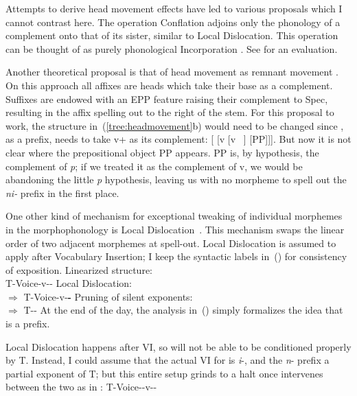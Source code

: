 Attempts to derive head movement effects have led to various proposals which I cannot contrast here. The operation Conflation \citep{halekeyser02,harley13oup} adjoins only the phonology of a complement onto that of its sister, similar to Local Dislocation. This operation can be thought of as purely phonological Incorporation \citep{baker85,baker88}. See \citet[Ch.~2.5]{rimell12} for an evaluation.

Another theoretical proposal is that of head movement as remnant movement \citep{koopmanszabolcsi00,koopman05,koopman15u20}. On this approach all affixes are heads which take their base as a complement. Suffixes are endowed with an EPP feature raising their complement to Spec, resulting in the affix spelling out to the right of the stem. For this proposal to work, the structure in~(\ref{tree:headmovement}b) would need to be changed since \pz, as a prefix, needs to take v+ as its complement: [{\pz} [v [v ~\!] [PP]]]. But now it is not clear where the prepositional object PP appears. PP is, by hypothesis, the complement of \emph{p}; if we treated it as the complement of v, we would be abandoning the little \emph{p} hypothesis, leaving us with no morpheme to spell out the \emph{ni-} prefix in the first place.

One other kind of mechanism for exceptional tweaking of individual morphemes in the morphophonology is Local Dislocation~\citep{embicknoyer01}. This mechanism swaps the linear order of two adjacent morphemes at spell-out. Local Dislocation is assumed to apply after Vocabulary Insertion; I keep the syntactic labels in~(\nextx) for consistency of exposition.
\pex
	\a Linearized structure:\\
		T-Voice-v--\pz
	\a Local Dislocation:\\
		$\Rightarrow$ T-Voice-v-\textbf{\pz-}
	\a Pruning of silent exponents:\\
		$\Rightarrow$ T-\pz-
\xe
At the end of the day, the analysis in~(\lastx) simply formalizes the idea that {\pz} is a prefix.

Local Dislocation happens after VI, so {\pz} will not be able to be conditioned properly by T. Instead, I could assume that the actual VI for {\pz} is \emph{i}-, and the \emph{n}- prefix a partial exponent of T; but this entire setup grinds to a halt once {\va} intervenes between the two as in {\thit}:
\ex T-Voice-{\va}-v-\pz-
\xe

